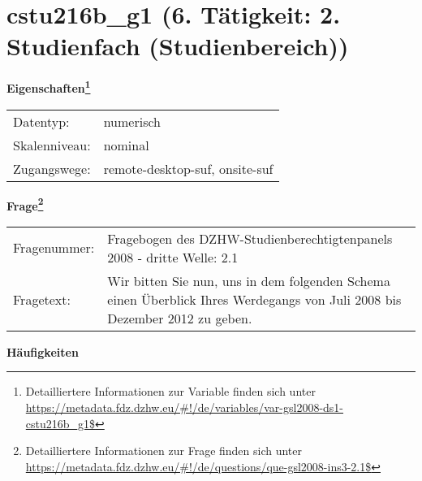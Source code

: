 
    \setcounter{footnote}{0}

    \vspace*{-1.8cm}
	\section{cstu216b\_g1 (6. Tätigkeit: 2. Studienfach (Studienbereich))}
	\label{section:cstu216b_g1}



    \vspace*{0.5cm}
    \noindent\textbf{Eigenschaften\footnote{Detailliertere Informationen zur Variable finden sich unter
		\url{https://metadata.fdz.dzhw.eu/\#!/de/variables/var-gsl2008-ds1-cstu216b_g1$}}}\\
	\begin{tabularx}{\hsize}{@{}lX}
	Datentyp: & numerisch \\
	Skalenniveau: & nominal \\
	Zugangswege: &
	  remote-desktop-suf, 
	  onsite-suf
 \\
    \end{tabularx}



				\vspace*{0.5cm}
                \noindent\textbf{Frage\footnote{Detailliertere Informationen zur Frage finden sich unter
		              \url{https://metadata.fdz.dzhw.eu/\#!/de/questions/que-gsl2008-ins3-2.1$}}}\\
				\begin{tabularx}{\hsize}{@{}lX}
					Fragenummer: &
					  Fragebogen des DZHW-Studienberechtigtenpanels 2008 - dritte Welle:
					  2.1
 \\
					Fragetext: & Wir bitten Sie nun, uns in dem folgenden Schema einen Überblick Ihres Werdegangs von Juli 2008 bis Dezember 2012 zu geben. \\
				\end{tabularx}





        		\vspace*{0.5cm}
                \noindent\textbf{Häufigkeiten}

